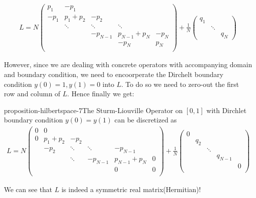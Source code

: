 \begin{equation}
\begin{aligned}
L=N\begin{pmatrix}
p_1&  -p_1 & & &  \\
-p_1& p_1+p_2 &  -p_2 & &  \\
&  \ddots  &  \ddots &   \ddots &   \\
&  &-p_{N-1} &p_{N-1}+p_{N} & -p_N  \\
& & &-p_N & p_N \\
\end{pmatrix} 
+ 
\frac{1}{N}\begin{pmatrix}q_1 & & \\
& \ddots & \\
& & q_N
\end{pmatrix}
\end{aligned}
\end{equation}

However, since we are dealing with concrete operators with accompanying domain and boundary condition, we need to encoorperate the Dirchelt boundary condition $y(0)=1, y(1)=0$ into $L$. To do so we need to zero-out the first row and column of $L$. Hence finally we get:

\begin{mystthmproposition}{}{proposition-hilbertspace-7}The Sturm-Liouville Operator on $[0,1]$ with Dirchlet boundary condition $y(0)=y(1)$ can be discretized as
\begin{equation}
\label{discreteSL}
\begin{aligned}
L=N\begin{pmatrix}
0 &0 & & &  &\\
0 &p_1+p_2 & -p_2& & & \\
&-p_2&  \ddots &\ddots & -p_{N-1}& \\
& & \ddots &-p_{N-1} & p_{N-1}+p_N &0 \\
& & & &0 & 0\\
\end{pmatrix} 
+ 
\frac{1}{N}\begin{pmatrix}0 & & & & \\
& q_2 & & & \\
&  & \ddots& & \\
& & & q_{N-1} & \\
& &  & & 0  \\
\end{pmatrix}
\end{aligned}
\end{equation}

\end{mystthmproposition}
We can see that $L$ is indeed a symmetric real matrix(Hermitian)!

